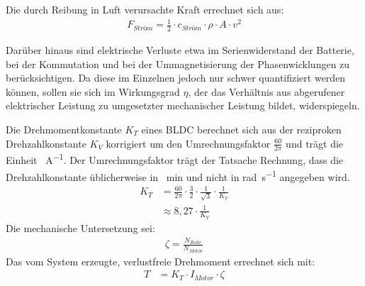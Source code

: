 	Die durch Reibung in Luft verursachte Kraft errechnet sich aus:
	\begin{align}
		F_{Ström} = \frac{1}{2} \cdot c_{Ström} \cdot \rho \cdot A \cdot v^2
		\label{eq:air drag}
	\end{align}

	Darüber hinaus sind elektrische Verluste etwa im Serienwiderstand der Batterie, bei der Kommutation und bei der Ummagnetisierung der Phasenwicklungen zu berücksichtigen.
	Da diese im Einzelnen jedoch nur schwer quantifiziert werden können, sollen sie sich im Wirkungsgrad \(\eta\), der das Verhältnis aus abgerufener elektrischer Leistung zu umgesetzter mechanischer Leistung bildet, widerspiegeln.\par\medskip
	Die Drehmomentkonstante \(K_T\) eines BLDC berechnet sich aus der reziproken Drehzahlkonstante \(K_V\) korrigiert um den Umrechnungsfaktor \(\frac{60}{2\pi}\) und trägt die Einheit \unit{\newtonmetre\per\ampere}.
	Der Umrechnungsfaktor trägt der Tatsache Rechnung, dass die Drehzahlkonstante üblicherweise in \unit{\per\minute} und nicht in \unit{\radian\per\second} angegeben wird\cite{DalY.Ohm.2000}.
	\begin{align}
		K_T	&= \frac{60}{2\pi} \cdot \frac{3}{2} \cdot \frac{1}{\sqrt{3}} \cdot \frac{1}{K_V} \nonumber \\
			&\approx 8,27 \cdot \frac{1}{K_V}
		\label{eq:kv to kt}
	\end{align}
	Die mechanische Untersetzung sei:
	\begin{align}
		\zeta = \frac{N_{Rolle}}{N_{Motor}}
		\label{eq:reduction}
	\end{align}
	Das vom System erzeugte, verlustfreie Drehmoment errechnet sich mit:
	\begin{align}
		T	&= K_T \cdot I_{Motor} \cdot \zeta
		\label{eq:frictionless torque}
	\end{align}
